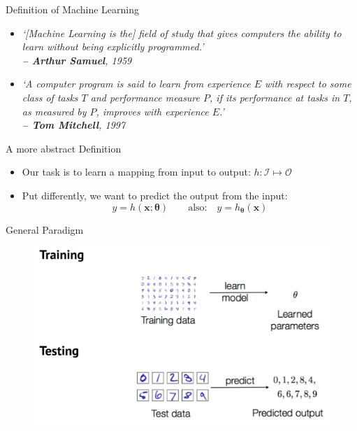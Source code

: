\begin{frame}{Definition of Machine Learning}{}
	\begin{itemize}
		\item \textit{`[Machine Learning is the] field of study that gives computers the ability
			to learn without being explicitly programmed.' \\
			\hfill\textbf{-- Arthur Samuel}, 1959}
		\vspace*{5mm}
		\item \textit{`A computer program is said to learn from experience $E$ with respect to some class of 
			tasks $T$ and performance measure $P$, if its performance at tasks in $T$, as measured by $P$, improves with
			experience $E$.' \\
			\hfill\textbf{-- Tom Mitchell}, 1997}
	\end{itemize}
\end{frame}


\begin{frame}{A more abstract Definition}{}\important
	\begin{itemize}
		\item Our task is to learn a mapping from input to output: $h : \mathcal{I} \mapsto \mathcal{O}$
		\item Put differently, we want to predict the output from the input:
		\begin{equation*}
			y = h(\bm{x}; \bm{\theta}) \qquad\text{also:}\quad y = h_{\bm{\theta}}(\bm{x})
		\end{equation*}
	\end{itemize}
\end{frame}


\begin{frame}{General Paradigm}{}\important
	\begin{figure}
		\centering
		\includegraphics[scale=0.25]{01_intro_ml/02_img/general_paradigm}
	\end{figure}
\end{frame}



